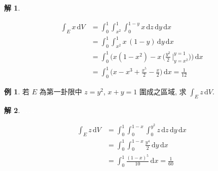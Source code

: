 \documentclass[12pt]{extarticle}
\newcommand{\ds}{\displaystyle}
\theoremstyle{definition}
\newtheorem*{ex}{例}
\newtheorem*{sol}{解}
\begin{document}
\begin{sol}
  \begin{minipage}{0.57\textwidth}
    \includegraphics[scale=0.6,page=13]{fig/prob.pdf} 
    \includegraphics[scale=0.6,page=14]{fig/prob.pdf}
    \includegraphics[scale=0.6,page=15]{fig/prob.pdf} 
  \end{minipage}
  \begin{minipage}{0.43\textwidth}
    \begin{align*}
      \int_E x\,\text{d}V 
      &= \int_0^1\!\!\int_{x^2}^1\!\int_0^{1 - y}\!\!x\,\text{d}z\,\text{d}y\,\text{d}x \\
      &= \int_0^1\!\!\int_{x^2}^1\!x\,(1 - y)\,\text{d}y\,\text{d}x \\ 
      &= \int_0^1\!\!\bigg(x(1 - x^2) - x\,\bigg(\frac{y^2}{2}\,\bigg|^{y = 1}_{y = x^2}\bigg)\bigg)\,\text{d}x \\ 
      &= \int_0^1\!\!\bigg(x - x^3 + \frac{x^5}{2} - \frac{x}{2}\bigg)\,\text{d}x = \frac{1}{12}
    \end{align*}
  \end{minipage}
\end{sol}

\begin{ex}
  若 $E$ 為第一卦限中 $z = y^2$, $x + y = 1$ 圍成之區域, 求 $\ds\int_E z\,\text{d}V$.
\end{ex}

\begin{sol}
  \begin{minipage}{0.65\textwidth}
    \includegraphics[scale=0.6,page=16]{fig/prob.pdf}
    \includegraphics[scale=0.6,page=17]{fig/prob.pdf}
    \includegraphics[scale=0.6,page=18]{fig/prob.pdf} 
    \includegraphics[scale=0.7,page=19]{fig/prob.pdf} 
  \end{minipage}
  \begin{minipage}{0.35\textwidth}
    \begin{align*}
      \int_E z\,\text{d}V &= \int_0^1\!\!\int_0^{1 - x}\!\!\!\int_0^{y^2}\!\!z\,\text{d}z\,\text{d}y\,\text{d}x \\ 
      &= \int_0^1\!\!\int_0^{1 - x}\frac{y^4}{2}\,\text{d}y\,\text{d}x \\
      &= \int_0^1\!\frac{(1 - x)^5}{10}\,\text{d}x = \frac{1}{60}
    \end{align*}
  \end{minipage}
\end{sol}
\end{document}
